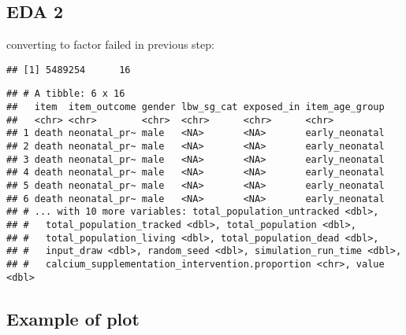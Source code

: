 \documentclass[]{article}
\newenvironment{Shaded}{\begin{snugshade}}{\end{snugshade}}
\newcommand{\KeywordTok}[1]{\textcolor[rgb]{0.13,0.29,0.53}{\textbf{#1}}}
\newcommand{\NormalTok}[1]{#1}
\newcommand{\OperatorTok}[1]{\textcolor[rgb]{0.81,0.36,0.00}{\textbf{#1}}}
\newcommand{\StringTok}[1]{\textcolor[rgb]{0.31,0.60,0.02}{#1}}
\begin{document}
\hypertarget{eda-2}{%
\subsection{EDA 2}\label{eda-2}}

converting to factor failed in previous step:

\begin{Shaded}
\end{Shaded}

\begin{verbatim}
## [1] 5489254      16
\end{verbatim}

\begin{Shaded}
\end{Shaded}

\begin{verbatim}
## # A tibble: 6 x 16
##   item  item_outcome gender lbw_sg_cat exposed_in item_age_group
##   <chr> <chr>        <chr>  <chr>      <chr>      <chr>         
## 1 death neonatal_pr~ male   <NA>       <NA>       early_neonatal
## 2 death neonatal_pr~ male   <NA>       <NA>       early_neonatal
## 3 death neonatal_pr~ male   <NA>       <NA>       early_neonatal
## 4 death neonatal_pr~ male   <NA>       <NA>       early_neonatal
## 5 death neonatal_pr~ male   <NA>       <NA>       early_neonatal
## 6 death neonatal_pr~ male   <NA>       <NA>       early_neonatal
## # ... with 10 more variables: total_population_untracked <dbl>,
## #   total_population_tracked <dbl>, total_population <dbl>,
## #   total_population_living <dbl>, total_population_dead <dbl>,
## #   input_draw <dbl>, random_seed <dbl>, simulation_run_time <dbl>,
## #   calcium_supplementation_intervention.proportion <chr>, value <dbl>
\end{verbatim}

\hypertarget{example-of-plot}{%
\subsection{Example of plot}\label{example-of-plot}}

\begin{Shaded}
\end{Shaded}
\end{document}

